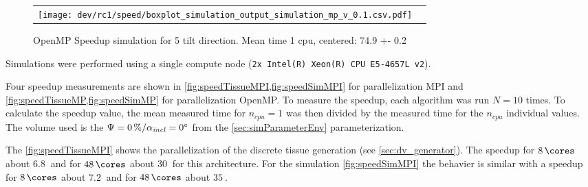 %
\begin{figure}[!t]
\centering
%
\begin{lrbox}{\newtable}
\end{lrbox}
%
\begin{tabular}{cc}
\begin{minipage}{0.6\textwidth}
\texttt{[image: dev/rc1/speed/boxplot\_simulation\_output\_simulation\_mp\_v\_0.1.csv.pdf]}
\end{minipage}
&
\begin{minipage}{0.25\textwidth}
\usebox{\newtable}
\end{minipage}
\end{tabular}
\caption{OpenMP Speedup simulation for 5 tilt direction. Mean time 1 cpu, centered: 74.9 +- 0.2}
\label{fig:speedSimMP}
\end{figure}
%
Simulations were performed using a single compute node (\texttt{2x Intel(R) Xeon(R) CPU E5-4657L v2}).
\par
%
Four speedup measurements are shown in \cref{fig:speedTissueMPI,fig:speedSimMPI} for parallelization \ac{MPI} and \cref{fig:speedTissueMP,fig:speedSimMP} for parallelization \ac{OpenMP}.
To measure the speedup, each algorithm was run $N=10$ times.
To calculate the speedup value, the mean measured time for $n_\mathit{cpu}=1$ was then divided by the measured time for the $n_\mathit{cpu}$ individual values.
The volume used is the $\textnormal{$\Psi$}=\SI{0}{\percent} / \textnormal{$\alpha_{\mathit{incl}}$}=\SI{0}{\degree}$ from the \cref{sec:simParameterEnv} parameterization.
\par
%
The \cref{fig:speedTissueMPI} shows the parallelization of the discrete tissue generation (see \cref{sec:dv_generator}).
The speedup for $\SI{8}{\cores}$ about $\SI{6.8}{}$ and for $\SI{48}{\cores}$ about $\SI{30}{}$ for this architecture.
For the simulation \cref{fig:speedSimMPI} the behavier is similar with a speedup for $\SI{8}{\cores}$ about $\SI{7.2}{}$ and for $\SI{48}{\cores}$ about $\SI{35}{}$.

